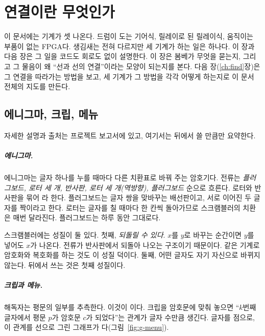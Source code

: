\chapter{연결이란 무엇인가}\label{ch:connect}

이 문서에는 기계가 셋 나온다. 드럼이 도는 기어식, 릴레이로 된 릴레이식, 움직이는 부품이 없는 FPGA다. 생김새는
전혀 다르지만 세 기계가 하는 일은 하나다. 이 장과 다음 장은 그 일을 코드도 회로도 없이 설명한다. 이 장은
봄베가 무엇을 묻는지, 그리고 그 물음이 왜 ``선과 선의 연결''이라는 모양이 되는지를 본다. 다음 장(\ref{ch:find}장)은
그 연결을 따라가는 방법을 보고, 세 기계가 그 방법을 각각 어떻게 하는지로 이 문서 전체의 지도를 만든다.

\section{에니그마, 크립, 메뉴}\label{sec:bombe-one-page}

자세한 설명과 출처는 프로젝트 보고서에 있고, 여기서는 뒤에서 쓸 만큼만 요약한다.

\paragraph{에니그마.} 에니그마는 글자 하나를 누를 때마다 다른 치환표로 바꿔 주는 암호기다. 전류는
\emph{플러그보드, 로터 세 개, 반사판, 로터 세 개(역방향), 플러그보드} 순으로 흐른다. 로터와 반사판을 묶어
라 한다. 플러그보드는 글자 쌍을 맞바꾸는 배선판이고, 서로 이어진 두 글자를
 짝이라고 한다. 로터는 글자를 칠 때마다 한 칸씩 돌아가므로 스크램블러의 치환은
매번 달라진다. 플러그보드는 하루 동안 그대로다.

스크램블러에는 성질이 둘 있다. 첫째, \emph{되돌릴 수 있다}. $x$를 $y$로 바꾸는 순간이면 $y$를 넣어도 $x$가
나온다. 전류가 반사판에서 되돌아 나오는 구조이기 때문이다. 같은 기계로 암호화와 복호화를 하는 것도 이
성질 덕이다. 둘째, 어떤 글자도 자기 자신으로 바뀌지 않는다. 뒤에서 쓰는 것은 첫째 성질이다.

\paragraph{크립과 메뉴.} 해독자는 평문의 일부를 추측한다. 이것이 이다. 크립을 암호문에
맞춰 놓으면 ``$k$번째 글자에서 평문 $p$가 암호문 $c$가 되었다''는 관계가 글자 수만큼 생긴다. 글자를
점으로, 이 관계를 선으로 그린 그래프가 다(그림~\ref{fig:g-menu}).

